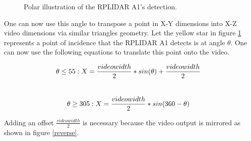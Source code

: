 \documentclass{article}
\begin{document}
  \begin{figure}[h]
    \centering
    \caption{ Polar illustration of the RPLIDAR A1's detection. }
		\label{polar}
  \end{figure}

  One can now use this angle to transpose a point in X-Y dimensions into X-Z video dimensions via similar triangles geometry.
  Let the yellow star in figure \ref{polar} represents a point of incidence that the RPLIDAR A1 detects is at angle \( \theta\).
  One can now use the following equations to translate this point onto the video.

\begin{equation} \label{eq1}
  \theta \leq  55:
  X = \frac{video width}{2} * sin(\theta) + \frac{video width}{2}\\
\end{equation}
\\
\begin{equation} \label{eq2}
  \theta \geq 305:
  X = \frac{video width}{2} * sin(360 - \theta)\\
\end{equation}

Adding an offset \(\frac{video width}{2}\) is necessary because the video output is mirrored as shown in figure \ref{reverse}.
\end{document}
